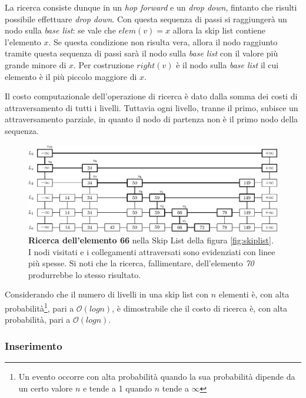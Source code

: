 			La ricerca consiste dunque in un \textit{hop forward} e un \textit{drop down}, fintanto che risulti possibile effettuare \textit{drop down}.  Con questa sequenza di passi si raggiungerà un nodo sulla \textit{base list}: se vale che $ elem(v) = x $ allora la skip list contiene l'elemento $ x $. Se questa condizione non risulta vera, allora il nodo raggiunto tramite questa sequenza di passi sarà il nodo sulla \textit{base list} con il valore più grande minore di $ x $. Per costruzione $ right(v) $ è il nodo sulla \textit{base list} il cui elemento è il più piccolo maggiore di $ x $.
			
			Il costo computazionale dell'operazione di ricerca è dato dalla somma dei costi di attraversamento di tutti i livelli. Tuttavia ogni livello, tranne il primo, subisce un attraversamento parziale, in quanto il nodo di partenza non è il primo nodo della sequenza.
			
			
			\begin{figure}
				\centering
				\includegraphics[scale=0.6]{figure/search-66.eps}
				\caption{\textbf{Ricerca dell'elemento 66} nella Skip List della figura \ref{fig:skiplist}. I nodi visitati e i collegamenti attraversati sono evidenziati con linee più spesse. Si noti che la ricerca, fallimentare, dell'elemento \textit{70} produrrebbe lo stesso risultato.}\label{fig:2}
			\end{figure}
			
			
			Considerando che il numero di livelli in una skip list con $ n $ elementi è, con alta probabilità\footnote{Un evento occorre con alta probabilità quando la sua probabilità dipende da un certo valore $ n $ e tende a 1 quando $ n $ tende a $\infty$}, pari a $\mathcal{O}(log{}n)$, è dimostrabile che il costo di ricerca è, con alta probabilità, pari a $\mathcal{O}(log{}n)$.
				
		\subsubsection{Inserimento}
		
